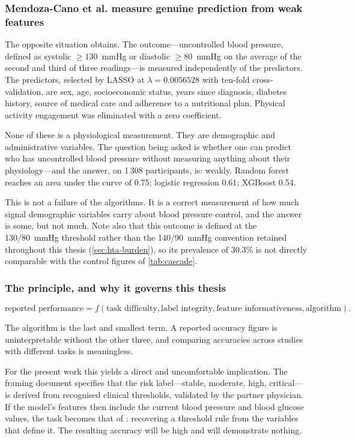 \documentclass[12pt,a4paper,oneside]{report}
\begin{document}
\subsubsection{Mendoza-Cano et al. measure genuine prediction from weak features}

The opposite situation obtains. The outcome---uncontrolled blood pressure, defined as systolic $\geq 130$~mmHg or diastolic $\geq 80$~mmHg on the average of the second and third of three readings---is measured independently of the predictors. The predictors, selected by LASSO at $\lambda = 0.0056528$ with ten-fold cross-validation, are sex, age, socioeconomic status, years since diagnosis, diabetes history, source of medical care and adherence to a nutritional plan. Physical activity engagement was eliminated with a zero coefficient.

None of these is a physiological measurement. They are demographic and administrative variables. The question being asked is whether one can predict who has uncontrolled blood pressure without measuring anything about their physiology---and the answer, on 1\,308 participants, is: weakly. Random forest reaches an area under the curve of 0.75; logistic regression 0.61; XGBoost 0.54.

This is not a failure of the algorithms. It is a correct measurement of how much signal demographic variables carry about blood pressure control, and the answer is some, but not much. Note also that this outcome is defined at the 130/80~mmHg threshold rather than the 140/90~mmHg convention retained throughout this thesis (\cref{sec:hta-burden}), so its prevalence of 30.3\% is not directly comparable with the control figures of \cref{tab:cascade}.

\subsubsection{The principle, and why it governs this thesis}\label{sec:principle}

\begin{equation}
  \text{reported performance} = f(\text{task difficulty}, \text{label integrity}, \text{feature informativeness}, \text{algorithm}).
\end{equation}

The algorithm is the last and smallest term. A reported accuracy figure is uninterpretable without the other three, and comparing accuracies across studies with different tasks is meaningless.

For the present work this yields a direct and uncomfortable implication. The framing document specifies that the risk label---stable, moderate, high, critical---is derived from recognised clinical thresholds, validated by the partner physician. If the model's features then include the current blood pressure and blood glucose values, the task becomes that of \textcite{efendi2025}: recovering a threshold rule from the variables that define it. The resulting accuracy will be high and will demonstrate nothing.
\end{document}
